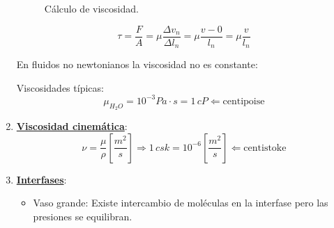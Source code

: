 \begin{enumerate}
\begin{figure}[H]
	\caption{Cálculo de viscosidad.}
	\label{fig:viscosidad}
\end{figure}

\[\tau =\frac{F}{A}=\mu \frac{\Delta v_n}{\Delta l_n} =\mu \frac{v - 0}{l_n}= \mu \frac{v}{l_n}\]
	 
	 En fluidos no newtonianos la viscosidad no es constante:
	 
	 \begin{center}
	 \end{center}
	 
	 Viscosidades típicas:
	 \[\mu_{H_2O}=10^{-3} Pa \cdot s = 1\,cP \Leftarrow \text{centipoise}\]
	\item \underline{\textbf{Viscosidad cinemática}}:
	\[\nu = \frac{\mu}{\rho} \left[\frac{m^2}{s}\right] \Rightarrow 1\,csk = 10^{-6}\left[\frac{m^2}{s}\right] \Leftarrow \text{centistoke}\]
	
	\item \underline{\textbf{Interfases}}: 
	\begin{itemize}
		\item Vaso grande: Existe intercambio de moléculas en la interfase pero las presiones se equilibran.


\end{itemize}
\end{enumerate}
